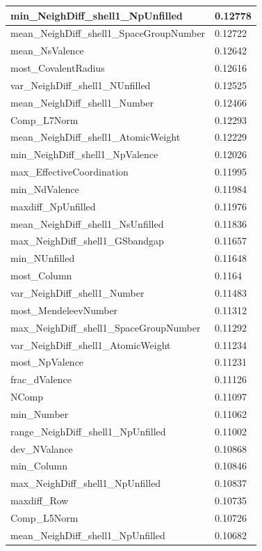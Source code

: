 \begin{longtable}{|l|l|}
min\_NeighDiff\_shell1\_NpUnfilled & 0.12778 \\ \hline
mean\_NeighDiff\_shell1\_SpaceGroupNumber & 0.12722 \\ \hline
mean\_NsValence & 0.12642 \\ \hline
most\_CovalentRadius & 0.12616 \\ \hline
var\_NeighDiff\_shell1\_NUnfilled & 0.12525 \\ \hline
mean\_NeighDiff\_shell1\_Number & 0.12466 \\ \hline
Comp\_L7Norm & 0.12293 \\ \hline
mean\_NeighDiff\_shell1\_AtomicWeight & 0.12229 \\ \hline
min\_NeighDiff\_shell1\_NpValence & 0.12026 \\ \hline
max\_EffectiveCoordination & 0.11995 \\ \hline
min\_NdValence & 0.11984 \\ \hline
maxdiff\_NpUnfilled & 0.11976 \\ \hline
mean\_NeighDiff\_shell1\_NsUnfilled & 0.11836 \\ \hline
max\_NeighDiff\_shell1\_GSbandgap & 0.11657 \\ \hline
min\_NUnfilled & 0.11648 \\ \hline
most\_Column & 0.1164 \\ \hline
var\_NeighDiff\_shell1\_Number & 0.11483 \\ \hline
most\_MendeleevNumber & 0.11312 \\ \hline
max\_NeighDiff\_shell1\_SpaceGroupNumber & 0.11292 \\ \hline
var\_NeighDiff\_shell1\_AtomicWeight & 0.11234 \\ \hline
most\_NpValence & 0.11231 \\ \hline
frac\_dValence & 0.11126 \\ \hline
NComp & 0.11097 \\ \hline
min\_Number & 0.11062 \\ \hline
range\_NeighDiff\_shell1\_NpUnfilled & 0.11002 \\ \hline
dev\_NValance & 0.10868 \\ \hline
min\_Column & 0.10846 \\ \hline
max\_NeighDiff\_shell1\_NpUnfilled & 0.10837 \\ \hline
maxdiff\_Row & 0.10735 \\ \hline
Comp\_L5Norm & 0.10726 \\ \hline
mean\_NeighDiff\_shell1\_NpUnfilled & 0.10682 \\ \hline

\end{longtable}
